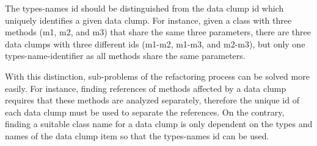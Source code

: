 The types-names id should be distinguished from the data clump id which uniquely identifies a given data clump. For instance, given a class with three methods (m1, m2, and m3) that share the same three parameters, there are three data clumps with three different ids (m1-m2, m1-m3, and m2-m3), but only one types-name-identifier as all methods share the same parameters. 

With this distinction, sub-problems of the refactoring process can be solved more easily. For instance, finding references of methods affected by a data clump requires that these methods are analyzed separately, therefore the unique id of each data clump must be used to separate the references. On the contrary, finding a suitable class name for a data clump is only dependent on the types and names of the data clump item so that the types-names id can be used. 





